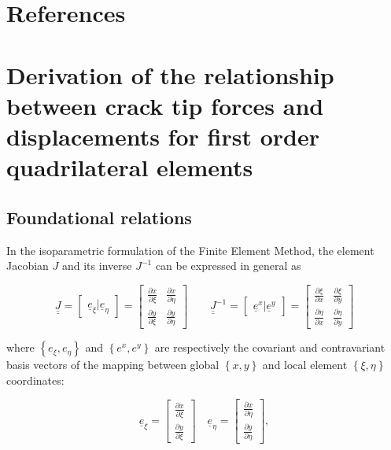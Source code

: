 %
\section*{References}
\printbibliography[heading=none]

\paperappendix
\section{Derivation of the relationship between crack tip forces and displacements for first order quadrilateral elements}\label{paperA:app:ctforcesexample}

\subsection{Foundational relations}

In the isoparametric formulation of the Finite Element Method, the element Jacobian $J$ and its inverse $J^{-1}$ can be expressed in general as

\begin{equation}
\underline{\underline{J}}=\begin{bmatrix}
\underline{e}_{\xi}|\underline{e}_{\eta}
\end{bmatrix}=\begin{bmatrix}
\frac{\partial x}{\partial\xi}&\frac{\partial x}{\partial\eta}\\\frac{\partial y}{\partial\xi}&\frac{\partial y}{\partial\eta}
\end{bmatrix}\qquad\underline{\underline{J}}^{-1}=\begin{bmatrix}
\underline{e}^{x}|\underline{e}^{y}
\end{bmatrix}=\begin{bmatrix}
\frac{\partial \xi}{\partial x}&\frac{\partial \xi}{\partial y}\\\frac{\partial \eta}{\partial x}&\frac{\partial \eta}{\partial y}
\end{bmatrix}
\end{equation}

where $\left\{e_{\xi}, e_{\eta}\right\}$ and $\left\{e^{x}, e^{y}\right\}$ are respectively the covariant and contravariant basis vectors of the mapping between global $\left\{x, y\right\}$ and local element $\left\{\xi, \eta\right\}$ coordinates:

\begin{equation}
\underline{e}_{\xi}=\begin{bmatrix}
\frac{\partial x}{\partial\xi}\\\frac{\partial y}{\partial\xi}
\end{bmatrix}\quad\underline{e}_{\eta}=\begin{bmatrix}
\frac{\partial x}{\partial\eta}\\\frac{\partial y}{\partial\eta}
\end{bmatrix},
\end{equation}

